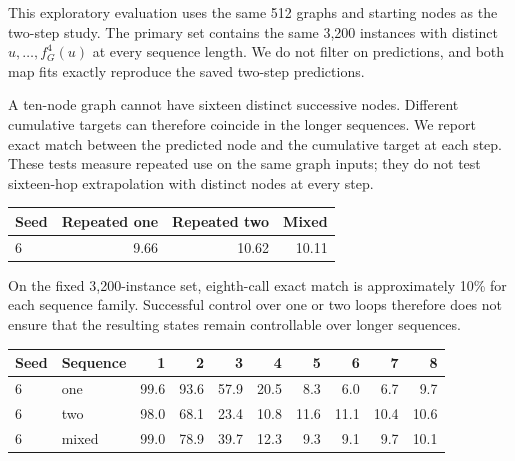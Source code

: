 \documentclass{article}
\begin{document}
This exploratory evaluation uses the same 512 graphs and starting nodes as the two-step study. The primary set contains the same 3,200 instances with distinct $u,\ldots,f_G^4(u)$ at every sequence length. We do not filter on predictions, and both map fits exactly reproduce the saved two-step predictions.

A ten-node graph cannot have sixteen distinct successive nodes. Different cumulative targets can therefore coincide in the longer sequences. We report exact match between the predicted node and the cumulative target at each step. These tests measure repeated use on the same graph inputs; they do not test sixteen-hop extrapolation with distinct nodes at every step.

\begin{center}\begin{minipage}{\linewidth}\centering
\captionsetup{hypcap=false}
\begin{tabular}{lrrr}\toprule
Seed & Repeated one & Repeated two & Mixed\\\midrule
6 & 9.66 & 10.62 & 10.11 \\
\bottomrule\end{tabular}\end{minipage}\end{center}

On the fixed 3,200-instance set, eighth-call exact match is approximately 10\% for each sequence family. Successful control over one or two loops therefore does not ensure that the resulting states remain controllable over longer sequences.

\begin{center}\begin{minipage}{\linewidth}\centering
\captionsetup{hypcap=false}

\begin{tabular}{@{}llrrrrrrrr@{}}\toprule
Seed & Sequence & 1 & 2 & 3 & 4 & 5 & 6 & 7 & 8\\\midrule
6 & one & 99.6 & 93.6 & 57.9 & 20.5 & 8.3 & 6.0 & 6.7 & 9.7 \\
6 & two & 98.0 & 68.1 & 23.4 & 10.8 & 11.6 & 11.1 & 10.4 & 10.6 \\
6 & mixed & 99.0 & 78.9 & 39.7 & 12.3 & 9.3 & 9.1 & 9.7 & 10.1 \\
\bottomrule\end{tabular}\end{minipage}\end{center}
\end{document}
